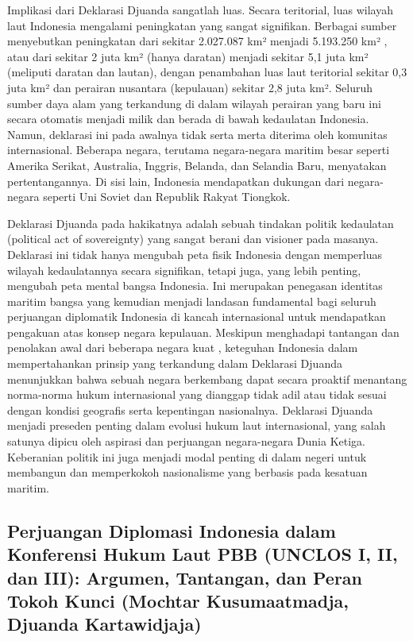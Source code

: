 \documentclass[12pt, a4paper]{article}
\begin{document}
Implikasi dari Deklarasi Djuanda sangatlah luas. Secara teritorial, luas wilayah laut Indonesia mengalami peningkatan yang sangat signifikan. Berbagai sumber menyebutkan peningkatan dari sekitar 2.027.087 km² menjadi 5.193.250 km² , atau dari sekitar 2 juta km² (hanya daratan) menjadi sekitar 5,1 juta km² (meliputi daratan dan lautan), dengan penambahan luas laut teritorial sekitar 0,3 juta km² dan perairan nusantara (kepulauan) sekitar 2,8 juta km². Seluruh sumber daya alam yang terkandung di dalam wilayah perairan yang baru ini secara otomatis menjadi milik dan berada di bawah kedaulatan Indonesia. Namun, deklarasi ini pada awalnya tidak serta merta diterima oleh komunitas internasional. Beberapa negara, terutama negara-negara maritim besar seperti Amerika Serikat, Australia, Inggris, Belanda, dan Selandia Baru, menyatakan pertentangannya. Di sisi lain, Indonesia mendapatkan dukungan dari negara-negara seperti Uni Soviet dan Republik Rakyat Tiongkok.  

Deklarasi Djuanda pada hakikatnya adalah sebuah tindakan politik kedaulatan (political act of sovereignty) yang sangat berani dan visioner pada masanya. Deklarasi ini tidak hanya mengubah peta fisik Indonesia dengan memperluas wilayah kedaulatannya secara signifikan, tetapi juga, yang lebih penting, mengubah peta mental bangsa Indonesia. Ini merupakan penegasan identitas maritim bangsa yang kemudian menjadi landasan fundamental bagi seluruh perjuangan diplomatik Indonesia di kancah internasional untuk mendapatkan pengakuan atas konsep negara kepulauan. Meskipun menghadapi tantangan dan penolakan awal dari beberapa negara kuat , keteguhan Indonesia dalam mempertahankan prinsip yang terkandung dalam Deklarasi Djuanda menunjukkan bahwa sebuah negara berkembang dapat secara proaktif menantang norma-norma hukum internasional yang dianggap tidak adil atau tidak sesuai dengan kondisi geografis serta kepentingan nasionalnya. Deklarasi Djuanda menjadi preseden penting dalam evolusi hukum laut internasional, yang salah satunya dipicu oleh aspirasi dan perjuangan negara-negara Dunia Ketiga. Keberanian politik ini juga menjadi modal penting di dalam negeri untuk membangun dan memperkokoh nasionalisme yang berbasis pada kesatuan maritim.  
\subsection*{Perjuangan Diplomasi Indonesia dalam Konferensi Hukum Laut PBB (UNCLOS I, II, dan III): Argumen, Tantangan, dan Peran Tokoh Kunci (Mochtar Kusumaatmadja, Djuanda Kartawidjaja)}
\end{document}
